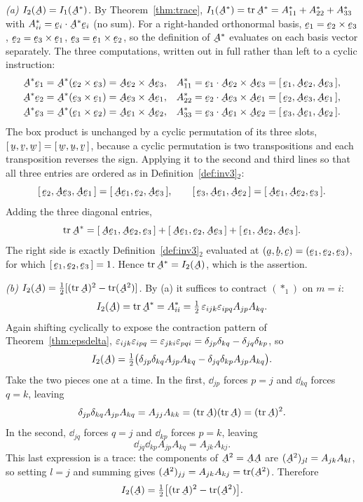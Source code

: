 \begin{solution}
\medskip
\emph{(a) $I_{2}(\bA)=I_{1}(\bA^{*})$.}
By Theorem~\ref{thm:trace}, $I_{1}(\bA^{*})=\tr\bA^{*}=A^{*}_{11}+A^{*}_{22}
+A^{*}_{33}$ with $A^{*}_{ii}=\ip{\be_{i}}{\bA^{*}\be_{i}}$ (no sum). For a
right-handed orthonormal basis,
$\be_{1}=\be_{2}\times\be_{3}$, $\be_{2}=\be_{3}\times\be_{1}$,
$\be_{3}=\be_{1}\times\be_{2}$, so the definition of $\bA^{*}$ evaluates on
each basis vector separately. The three computations, written out in full
rather than left to a cyclic instruction:
\[
\begin{aligned}
   \bA^{*}\be_{1}&=\bA^{*}(\be_{2}\times\be_{3})=\bA\be_{2}\times\bA\be_{3},
   &A^{*}_{11}&=\ip{\be_{1}}{\bA\be_{2}\times\bA\be_{3}}
               =\tbox{\be_{1}}{\bA\be_{2}}{\bA\be_{3}},\\
   \bA^{*}\be_{2}&=\bA^{*}(\be_{3}\times\be_{1})=\bA\be_{3}\times\bA\be_{1},
   &A^{*}_{22}&=\ip{\be_{2}}{\bA\be_{3}\times\bA\be_{1}}
               =\tbox{\be_{2}}{\bA\be_{3}}{\bA\be_{1}},\\
   \bA^{*}\be_{3}&=\bA^{*}(\be_{1}\times\be_{2})=\bA\be_{1}\times\bA\be_{2},
   &A^{*}_{33}&=\ip{\be_{3}}{\bA\be_{1}\times\bA\be_{2}}
               =\tbox{\be_{3}}{\bA\be_{1}}{\bA\be_{2}} .
\end{aligned}
\]
The box product is unchanged by a cyclic permutation of its three slots,
$\tbox\bu\bv\bw=\tbox\bw\bu\bv$, because a cyclic permutation is two
transpositions and each transposition reverses the sign. Applying it to the
second and third lines so that all three entries are ordered as in
Definition~\ref{def:inv3}$_{2}$:
\[
   \tbox{\be_{2}}{\bA\be_{3}}{\bA\be_{1}}
   =\tbox{\bA\be_{1}}{\be_{2}}{\bA\be_{3}},\qquad
   \tbox{\be_{3}}{\bA\be_{1}}{\bA\be_{2}}
   =\tbox{\bA\be_{1}}{\bA\be_{2}}{\be_{3}} .
\]
Adding the three diagonal entries,
\[
   \tr\bA^{*}=\tbox{\bA\be_{1}}{\bA\be_{2}}{\be_{3}}
             +\tbox{\bA\be_{1}}{\be_{2}}{\bA\be_{3}}
             +\tbox{\be_{1}}{\bA\be_{2}}{\bA\be_{3}} .
\]
The right side is exactly Definition~\ref{def:inv3}$_{2}$ evaluated at
$(\ba,\bb,\bc)=(\be_{1},\be_{2},\be_{3})$, for which
$\tbox{\be_{1}}{\be_{2}}{\be_{3}}=1$. Hence $\tr\bA^{*}=I_{2}(\bA)$, which
is the assertion.

\medskip
\emph{(b) $I_{2}(\bA)=\tfrac12[(\tr\bA)^{2}-\tr(\bA^{2})]$.}
By (a) it suffices to contract $(\ast_1)$ on $m=i$:
\[
   I_{2}(\bA)=\tr\bA^{*}=A^{*}_{ii}
   =\tfrac12\,\eps_{ijk}\eps_{ipq}A_{jp}A_{kq}.
\]
Again shifting cyclically to expose the contraction pattern of
Theorem~\ref{thm:epsdelta},
$\varepsilon_{ijk}\varepsilon_{ipq}=\varepsilon_{jki}\varepsilon_{pqi}=\delta_{jp}\delta_{kq}
-\delta_{jq}\delta_{kp}$, so
\[
   I_{2}(\bA)=\tfrac12\big(\dd_{jp}\dd_{kq}A_{jp}A_{kq}
                          -\dd_{jq}\dd_{kp}A_{jp}A_{kq}\big).
\]
Take the two pieces one at a time. In the first, $\dd_{jp}$ forces $p=j$ and
$\dd_{kq}$ forces $q=k$, leaving
\[
   \dd_{jp}\dd_{kq}A_{jp}A_{kq}=A_{jj}A_{kk}=(\tr\bA)(\tr\bA)=(\tr\bA)^{2}.
\]
In the second, $\dd_{jq}$ forces $q=j$ and $\dd_{kp}$ forces $p=k$, leaving
\[
   \dd_{jq}\dd_{kp}A_{jp}A_{kq}=A_{jk}A_{kj}.
\]
This last expression is a trace: the components of $\bA^{2}=\bA\bA$ are
$(\bA^{2})_{jl}=A_{jk}A_{kl}$, so setting $l=j$ and summing gives
$(\bA^{2})_{jj}=A_{jk}A_{kj}=\tr(\bA^{2})$. Therefore
\[
   I_{2}(\bA)=\tfrac12\big[(\tr\bA)^{2}-\tr(\bA^{2})\big].
\]


\end{solution}
